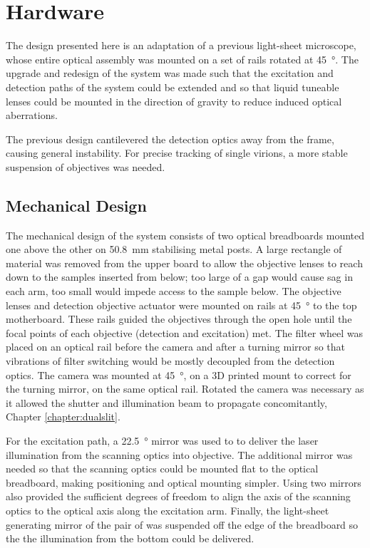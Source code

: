 \section{Hardware}

The design presented here is an adaptation of a previous light-sheet microscope, whose entire optical assembly was mounted on a set of rails rotated at \SI{45}{\degree}.
The upgrade and redesign of the system was made such that the excitation and detection paths of the system could be extended and so that liquid tuneable lenses could be mounted in the direction of gravity to reduce induced optical aberrations.

The previous design cantilevered the detection optics away from the frame, causing general instability.
For precise tracking of single virions, a more stable suspension of objectives was needed.

\subsection{Mechanical Design}

The mechanical design of the system consists of two optical breadboards mounted one above the other on \SI{50.8}{\milli\metre} stabilising metal posts.
A large rectangle of material was removed from the upper board to allow the objective lenses to reach down to the samples inserted from below; too large of a gap would cause sag in each arm, too small would impede access to the sample below.
The objective lenses and detection objective actuator were mounted on rails at \SI{45}{\degree} to the top motherboard.
These rails guided the objectives through the open hole until the focal points of each objective (detection and excitation) met.
The filter wheel was placed on an optical rail before the camera and after a turning mirror so that vibrations of filter switching would be mostly decoupled from the detection optics.
The camera was mounted at \SI{45}{\degree}, on a 3D printed mount to correct for the turning mirror, on the same optical rail.
Rotated the camera was necessary as it allowed the shutter and illumination beam to propagate concomitantly, Chapter \ref{chapter:dualslit}.

For the excitation path, a \SI{22.5}{\degree} mirror was used to to deliver the laser illumination from the scanning optics into objective.
The additional mirror was needed so that the scanning optics could be mounted flat to the optical breadboard, making positioning and optical mounting simpler.
Using two mirrors also provided the sufficient degrees of freedom to align the axis of the scanning optics to the optical axis along the excitation arm.
Finally, the light-sheet generating mirror of the pair of was suspended off the edge of the breadboard so the the illumination from the bottom could be delivered.

